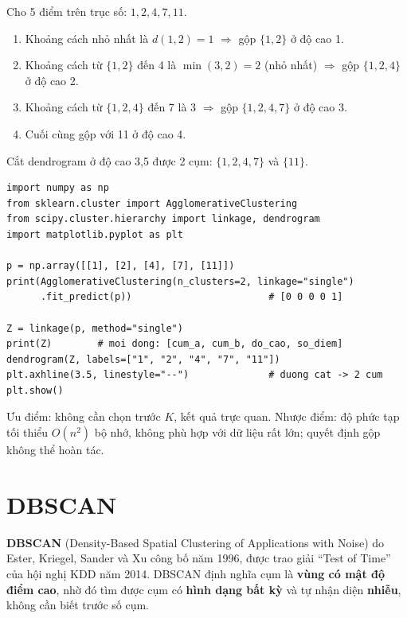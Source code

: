 \begin{example}
Cho 5 điểm trên trục số: $1, 2, 4, 7, 11$.
\begin{enumerate}
    \item Khoảng cách nhỏ nhất là $d(1, 2) = 1$ $\Rightarrow$ gộp $\{1, 2\}$ ở độ cao 1.
    \item Khoảng cách từ $\{1, 2\}$ đến 4 là $\min(3, 2) = 2$ (nhỏ nhất) $\Rightarrow$ gộp $\{1, 2, 4\}$ ở độ cao 2.
    \item Khoảng cách từ $\{1, 2, 4\}$ đến 7 là 3 $\Rightarrow$ gộp $\{1, 2, 4, 7\}$ ở độ cao 3.
    \item Cuối cùng gộp với 11 ở độ cao 4.
\end{enumerate}
Cắt dendrogram ở độ cao 3,5 được 2 cụm: $\{1, 2, 4, 7\}$ và $\{11\}$.
\end{example}

\begin{lstlisting}[caption={Phân cụm phân cấp và vẽ dendrogram}]
import numpy as np
from sklearn.cluster import AgglomerativeClustering
from scipy.cluster.hierarchy import linkage, dendrogram
import matplotlib.pyplot as plt

p = np.array([[1], [2], [4], [7], [11]])
print(AgglomerativeClustering(n_clusters=2, linkage="single")
      .fit_predict(p))                        # [0 0 0 0 1]

Z = linkage(p, method="single")
print(Z)        # moi dong: [cum_a, cum_b, do_cao, so_diem]
dendrogram(Z, labels=["1", "2", "4", "7", "11"])
plt.axhline(3.5, linestyle="--")              # duong cat -> 2 cum
plt.show()
\end{lstlisting}


Ưu điểm: không cần chọn trước $K$, kết quả trực quan. Nhược điểm: độ phức tạp tối thiểu $O(n^2)$ bộ nhớ, không phù hợp với dữ liệu rất lớn; quyết định gộp không thể hoàn tác.

\section{DBSCAN}

\textbf{DBSCAN} (Density-Based Spatial Clustering of Applications with Noise) do Ester, Kriegel, Sander và Xu công bố năm 1996, được trao giải ``Test of Time'' của hội nghị KDD năm 2014. DBSCAN định nghĩa cụm là \textbf{vùng có mật độ điểm cao}, nhờ đó tìm được cụm có \textbf{hình dạng bất kỳ} và tự nhận diện \textbf{nhiễu}, không cần biết trước số cụm.

